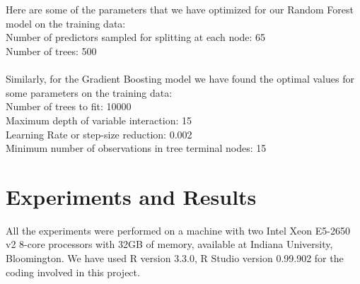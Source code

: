 \documentclass[fleqn,10pt]{SelfArx} %
\begin{document}
\\ \\ Here are some of the parameters that we have optimized for our Random Forest model on the training data:
\\ Number of predictors sampled for splitting at each node: 65
\\ Number of trees: 500
\\ \\ Similarly, for the Gradient Boosting model we have found the optimal values for some parameters on the training data:
\\ Number of trees to fit: 10000
\\ Maximum depth of variable interaction: 15
\\ Learning Rate or step-size reduction: 0.002
\\ Minimum number of observations in tree terminal nodes: 15


\section{Experiments and Results}
All the experiments were performed on a machine with two Intel Xeon E5-2650 v2 8-core processors with 32GB of memory, available at Indiana University, Bloomington. We have used R version 3.3.0, R Studio version 0.99.902 for the coding involved in this project.
\end{document}
